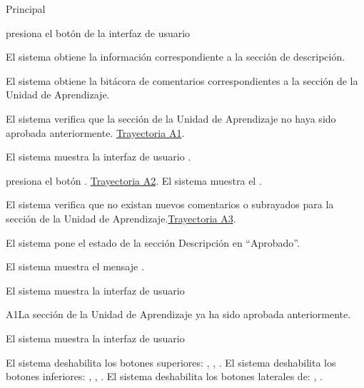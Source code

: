 \begin{UCtrayectoria}{Principal}

    \UCpaso[\UCactor] presiona el botón   de la interfaz de usuario 

    \UCpaso El sistema obtiene la información correspondiente a la sección de descripción.
    
    \UCpaso El sistema obtiene la bitácora de comentarios correspondientes a la sección de la Unidad de Aprendizaje. 
    
    \UCpaso El sistema verifica que la sección de la Unidad de Aprendizaje no haya sido aprobada anteriormente.  \hyperlink{SP2-CU7-A1}{Trayectoria A1}. 
    
    \UCpaso El sistema muestra la interfaz de usuario  .
    
    \UCpaso[\UCactor] presiona el botón . \hyperlink{SP2-CU7-A2}{Trayectoria A2}.
    \UCpaso El sistema muestra el .
    
    \UCpaso	El sistema verifica que no existan nuevos comentarios o subrayados para la sección de la Unidad de Aprendizaje.\hyperlink{SP2-CU7-A3}{Trayectoria A3}. 
    
    \UCpaso El sistema pone el estado de la sección Descripción  en “Aprobado”.
    
    \UCpaso El sistema muestra el mensaje .

    \UCpaso El sistema muestra la interfaz de usuario 

\end{UCtrayectoria}


\begin{UCtrayectoriaA}{A1}{La sección de la Unidad de Aprendizaje ya ha sido aprobada anteriormente.}

	\hypertarget{SP2-CU7-A1}{\UCpaso El sistema muestra la interfaz de usuario }
    \UCpaso El sistema deshabilita los botones superiores: , , .
    \UCpaso El sistema deshabilita los botones inferiores: , , .
    \UCpaso El sistema deshabilita los botones laterales de: , .
\end{UCtrayectoriaA}

